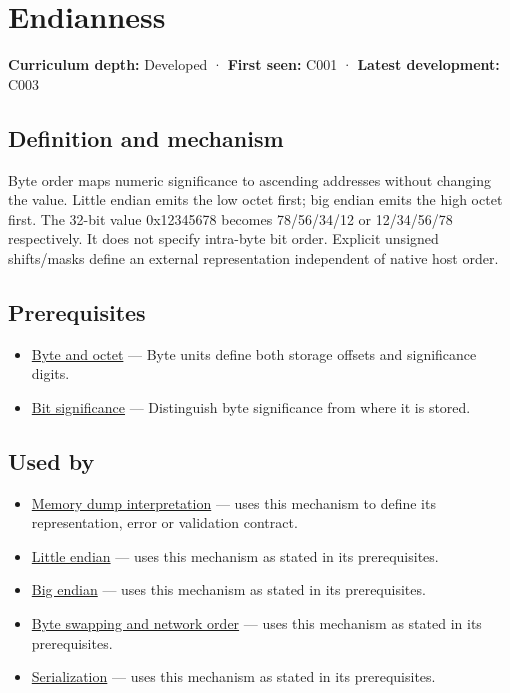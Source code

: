 \hypertarget{appendix-bc07c3d25b18}{}
\section{Endianness}\label{appendix-bc07c3d25b18-endianness}

\textbf{Curriculum depth:} Developed · \textbf{First seen:} C001 · \textbf{Latest development:} C003

\subsection{Definition and mechanism}\label{appendix-bc07c3d25b18-definition-and-mechanism}

Byte order maps numeric significance to ascending addresses without changing the value. Little endian emits the low octet first; big endian emits the high octet first. The 32-bit value 0x12345678 becomes 78/56/34/12 or 12/34/56/78 respectively. It does not specify intra-byte bit order. Explicit unsigned shifts/masks define an external representation independent of native host order.

\subsection{Prerequisites}\label{appendix-bc07c3d25b18-prerequisites}

\begin{itemize}
\tightlist
\item
  \hyperref[appendix-5bee2df85484]{Byte and octet} --- Byte units define both storage offsets and significance digits.
\item
  \hyperref[appendix-280445746493]{Bit significance} --- Distinguish byte significance from where it is stored.
\end{itemize}

\subsection{Used by}\label{appendix-bc07c3d25b18-used-by}

\begin{itemize}
\item
  \hyperref[appendix-230b59c0676b]{Memory dump interpretation} --- uses this mechanism to define its representation, error or validation contract.
\item
  \hyperref[appendix-367b6abf460e]{Little endian} --- uses this mechanism as stated in its prerequisites.
\item
  \hyperref[appendix-92e040df969a]{Big endian} --- uses this mechanism as stated in its prerequisites.
\item
  \hyperref[appendix-11ba36693aa2]{Byte swapping and network order} --- uses this mechanism as stated in its prerequisites.
\item
  \hyperref[appendix-91d09ebed979]{Serialization} --- uses this mechanism as stated in its prerequisites.
\end{itemize}

